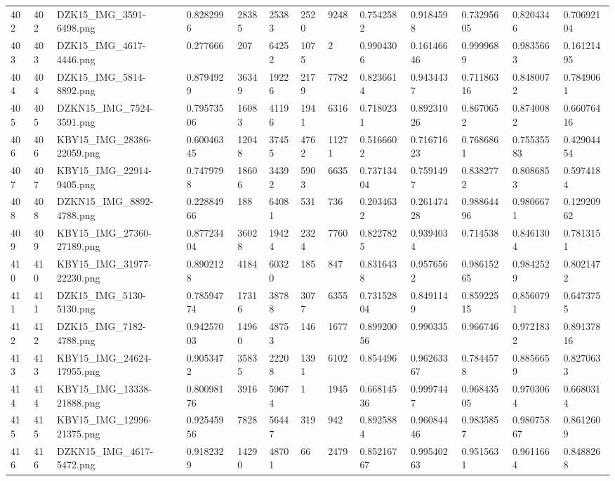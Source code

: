 \documentclass[11pt, a4paper, twoside]{report}
\begin{document}
\begin{longtable}[c]{@{}lllllllllllll@{}}
402 & 402 & DZK15\_IMG\_3591-6498.png & 0.8282996 & 28385 & 25383 & 2520 & 9248 & 0.7542582 & 0.9184598 & 0.73295605 & 0.8204346 & 0.70692104 \\
403 & 403 & DZK15\_IMG\_4617-4446.png & 0.277666 & 207 & 64252 & 1075 & 2 & 0.9904306 & 0.16146646 & 0.9999689 & 0.9835663 & 0.16121495 \\
404 & 404 & DZK15\_IMG\_5814-8892.png & 0.8794929 & 36349 & 19226 & 2179 & 7782 & 0.8236614 & 0.9434437 & 0.71186316 & 0.8480072 & 0.7849061 \\
405 & 405 & DZKN15\_IMG\_7524-3591.png & 0.79573506 & 16083 & 41196 & 1941 & 6316 & 0.7180231 & 0.89231026 & 0.8670652 & 0.8740082 & 0.66076416 \\
406 & 406 & KBY15\_IMG\_28386-22059.png & 0.60046345 & 12048 & 37455 & 4762 & 11271 & 0.5166602 & 0.71671623 & 0.7686861 & 0.75535583 & 0.42904454 \\
407 & 407 & KBY15\_IMG\_22914-9405.png & 0.7479798 & 18606 & 34392 & 5903 & 6635 & 0.73713404 & 0.7591497 & 0.8382772 & 0.8086853 & 0.5974184 \\
408 & 408 & DZKN15\_IMG\_8892-4788.png & 0.22884966 & 188 & 64081 & 531 & 736 & 0.2034632 & 0.26147428 & 0.98864496 & 0.9806671 & 0.12920962 \\
409 & 409 & KBY15\_IMG\_27360-27189.png & 0.87723404 & 36028 & 19424 & 2324 & 7760 & 0.8227825 & 0.9394034 & 0.714538 & 0.8461304 & 0.7813151 \\
410 & 410 & KBY15\_IMG\_31977-22230.png & 0.8902128 & 4184 & 60320 & 185 & 847 & 0.8316438 & 0.9576562 & 0.98615265 & 0.9842529 & 0.8021472 \\
411 & 411 & DZK15\_IMG\_5130-5130.png & 0.78594774 & 17316 & 38788 & 3077 & 6355 & 0.73152804 & 0.8491149 & 0.85922515 & 0.8560791 & 0.6473755 \\
412 & 412 & DZK15\_IMG\_7182-4788.png & 0.94257003 & 14960 & 48753 & 146 & 1677 & 0.89920056 & 0.990335 & 0.966746 & 0.9721832 & 0.89137816 \\
413 & 413 & KBY15\_IMG\_24624-17955.png & 0.9053472 & 35835 & 22208 & 1391 & 6102 & 0.854496 & 0.96263367 & 0.7844578 & 0.8856659 & 0.8270633 \\
414 & 414 & KBY15\_IMG\_13338-21888.png & 0.80098176 & 3916 & 59674 & 1 & 1945 & 0.66814536 & 0.9997447 & 0.96843505 & 0.9703064 & 0.6680314 \\
415 & 415 & KBY15\_IMG\_12996-21375.png & 0.92545956 & 7828 & 56447 & 319 & 942 & 0.8925884 & 0.96084446 & 0.9835857 & 0.98075867 & 0.8612609 \\
416 & 416 & DZKN15\_IMG\_4617-5472.png & 0.9182329 & 14290 & 48701 & 66 & 2479 & 0.85216767 & 0.99540263 & 0.9515631 & 0.9611664 & 0.8488268 \\

\end{longtable}
\end{document}
